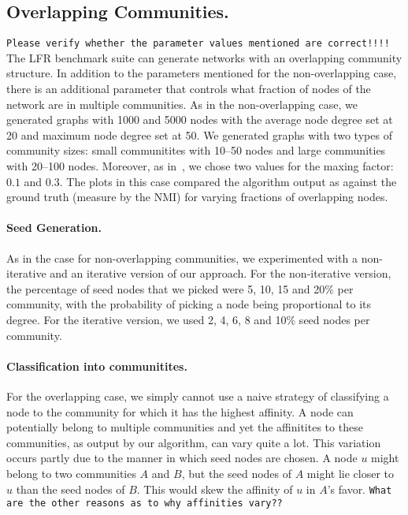 \subsection{Overlapping Communities.}
\texttt{Please verify whether the parameter values mentioned are correct!!!!}
The LFR benchmark suite can generate networks with an overlapping community structure. 
In addition to the parameters mentioned for the non-overlapping case, there is an additional 
parameter that controls what fraction of nodes of the network are in multiple communities. 
As in the non-overlapping case, we generated graphs with 1000 and 5000 nodes with the average
node degree set at 20 and maximum node degree set at 50. We generated graphs with two types 
of community sizes: small communitites with 10--50 nodes and large communities with 20--100 nodes.
Moreover, as in~\cite{LF09}, we chose two values for the maxing factor: $0.1$ and $0.3$. 
The plots in this case compared the algorithm output as against the ground truth (measure by 
the NMI) for varying fractions of overlapping nodes. 

\paragraph{Seed Generation.}
As in the case for non-overlapping communities, we experimented with a non-iterative 
and an iterative version of our approach. For the non-iterative version, the percentage 
of seed nodes that we picked were 5, 10, 15 and 20$\%$ per community, with the probability
of picking a node being proportional to its degree. For the iterative version, we used 
2, 4, 6, 8 and 10$\%$ seed nodes per community. 

\paragraph{Classification into communitites.} For the overlapping case, we simply 
cannot use a naive strategy of classifying a node to the community for which it has 
the highest affinity. A node can potentially belong to multiple communities and yet 
the affinitites to these communities, as output by our algorithm, can vary quite a lot. 
This variation occurs partly due to the manner in which seed nodes are chosen. A node $u$ might 
belong to two communities $A$ and $B$, but the seed nodes of $A$ might lie closer to $u$ than the 
seed nodes of $B$. This would skew the affinity of $u$ in $A$'s favor. \texttt{What are the other reasons 
as to why affinities vary??}


